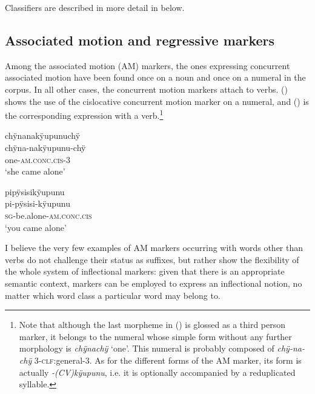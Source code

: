 Classifiers are described in more detail in  below.

\subsection{Associated motion and regressive markers}\label{sec:AffClAM}

Among the associated motion (AM) markers, the ones expressing concurrent associated motion have been found once on a noun and once on a numeral in the corpus. In all other cases, the concurrent motion markers attach to verbs. () shows the use of the cislocative concurrent motion marker on a numeral, and () is the corresponding expression with a verb.\footnote{Note that although the last morpheme in () is glossed as a third person marker, it belongs to the numeral whose simple form without any further morphology is \textit{chÿnachÿ} ‘one’. This numeral is probably composed of \textit{chÿ-na-chÿ} 3-\textsc{clf:}general-3. As for the different forms of the AM marker, its form is actually \textit{-(CV)kÿupunu}, i.e. it is optionally accompanied by a reduplicated syllable.}

\ea\label{ex:FirstAM-1}
\begingl
\glpreamble chÿnanakÿupunuchÿ\\
\gla chÿna-nakÿupunu-chÿ\\
\glb one-\textsc{am.conc.cis}-3\\
\glft ‘she came alone’
\endgl
\trailingcitation{[cux-120410ls.173]}
\xe

\ea\label{ex:FirstAM-2}
\begingl
\glpreamble pipÿsisikÿupunu\\
\gla pi-pÿsisi-kÿupunu\\
\textsc{sg}-be.alone-\textsc{am.conc.cis}\\
\glft ‘you came alone’
\endgl
\trailingcitation{[mrx-c120509l.023]}
\xe

I believe the very few examples of AM markers occurring with words other than verbs do not challenge their status as suffixes, but rather show the flexibility of the whole system of inflectional markers: given that there is an appropriate semantic context, markers can be employed to express an inflectional notion, no matter which word class a particular word may belong to. 

